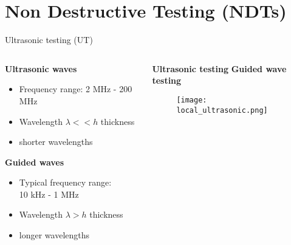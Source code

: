 \documentclass[10pt,aspectratio=169,dvipsnames]{beamer} %
\begin{document}
	\section{Non Destructive Testing (NDTs)}
%		
%		
%		
	\begin{frame}{Ultrasonic testing (UT)} 
		\begin{columns}[T]
			\begin{column}[c]{0.38\textwidth}
				\textbf{Ultrasonic waves}	
				\begin{itemize}
					\item Frequency range: 2 MHz - 200 MHz
					\item Wavelength \(\lambda << h\) thickness 
					\item shorter wavelengths
				\end{itemize}
				
				\textbf{Guided waves}	
				\begin{itemize}
					\item Typical frequency range: \\ 10 kHz - 1 MHz
					\item Wavelength \(\lambda > h\) thickness 
					\item longer wavelengths
				\end{itemize}
				
			\end{column}
			\begin{column}[c]{0.6\textwidth}				
				\textbf{Ultrasonic testing} \hspace{50pt} \textbf{Guided wave testing}
				\begin{figure}
					\texttt{[image: local\_ultrasonic.png]}
				\end{figure}
			\end{column}		
		\end{columns}	
	\end{frame}
\end{document}
